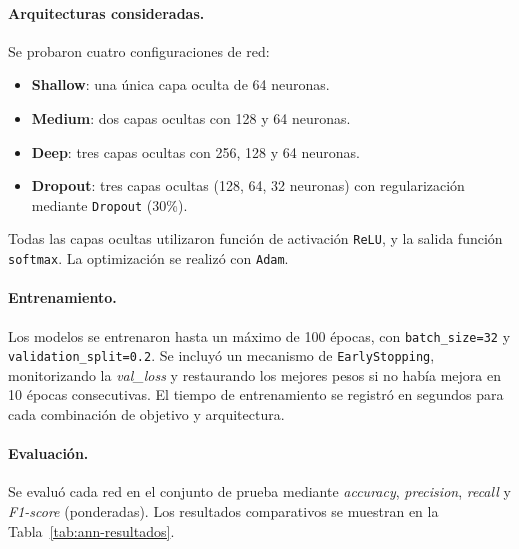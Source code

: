 \documentclass[11pt,a4paper,spanish]{book}
\numberwithin{equation}{chapter}
\numberwithin{figure}{chapter}
\begin{document}
\paragraph{Arquitecturas consideradas.}
Se probaron cuatro configuraciones de red:
\begin{itemize}
  \item \textbf{Shallow}: una única capa oculta de 64 neuronas.
  \item \textbf{Medium}: dos capas ocultas con 128 y 64 neuronas.
  \item \textbf{Deep}: tres capas ocultas con 256, 128 y 64 neuronas.
  \item \textbf{Dropout}: tres capas ocultas (128, 64, 32 neuronas) con regularización mediante
  \texttt{Dropout} (30\%).
\end{itemize}
Todas las capas ocultas utilizaron función de activación \texttt{ReLU}, y la salida
función \texttt{softmax}. La optimización se realizó con \texttt{Adam}.

\paragraph{Entrenamiento.}
Los modelos se entrenaron hasta un máximo de 100 épocas, con \texttt{batch\_size=32} y
\texttt{validation\_split=0.2}. Se incluyó un mecanismo de \texttt{EarlyStopping}, monitorizando
la \textit{val\_loss} y restaurando los mejores pesos si no había mejora en 10 épocas consecutivas.
El tiempo de entrenamiento se registró en segundos para cada combinación de objetivo y arquitectura.

\paragraph{Evaluación.}
Se evaluó cada red en el conjunto de prueba mediante \textit{accuracy}, \textit{precision},
\textit{recall} y \textit{F1-score} (ponderadas). Los resultados comparativos se muestran en la
Tabla~\ref{tab:ann-resultados}.
\end{document}
